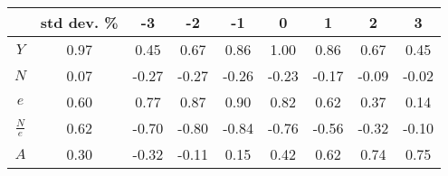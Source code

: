 \begin{tabular}{ccccccccc}
\toprule
 & std dev. \% & -3 & -2 & -1 & 0 & 1 & 2 & 3 \\
\midrule
$Y$ & 0.97 & 0.45 & 0.67 & 0.86 & 1.00 & 0.86 & 0.67 & 0.45 \\
$N$ & 0.07 & -0.27 & -0.27 & -0.26 & -0.23 & -0.17 & -0.09 & -0.02 \\
$e$ & 0.60 & 0.77 & 0.87 & 0.90 & 0.82 & 0.62 & 0.37 & 0.14 \\
$\frac{N}{e}$ & 0.62 & -0.70 & -0.80 & -0.84 & -0.76 & -0.56 & -0.32 & -0.10 \\
$A$ & 0.30 & -0.32 & -0.11 & 0.15 & 0.42 & 0.62 & 0.74 & 0.75 \\
\bottomrule
\end{tabular}
